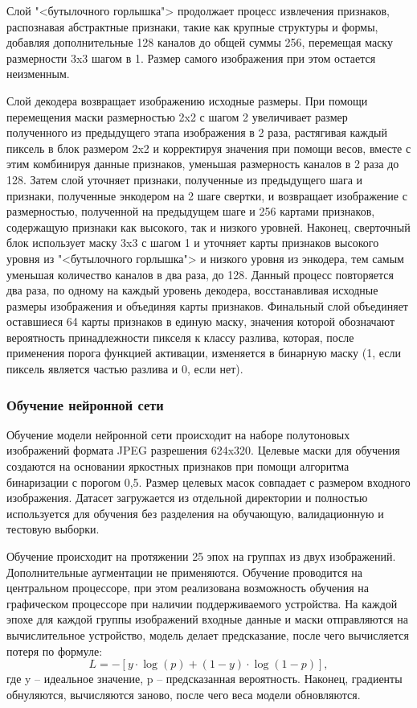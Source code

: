 Слой "<бутылочного горлышка">  продолжает процесс извлечения признаков, распознавая абстрактные признаки, такие как крупные структуры и формы, добавляя дополнительные 128 каналов до общей суммы 256, перемещая маску размерности 3x3 шагом в 1. Размер самого изображения при этом остается неизменным.

Слой декодера возвращает изображению исходные размеры. При помощи перемещения маски размерностью 2x2 с шагом 2 увеличивает размер полученного из предыдущего этапа изображения в 2 раза, растягивая каждый пиксель в блок размером 2x2 и корректируя значения при помощи весов, вместе с этим комбинируя данные признаков, уменьшая размерность каналов в 2 раза до 128. Затем слой уточняет признаки, полученные из предыдущего шага и признаки, полученные энкодером на 2 шаге свертки, и возвращает изображение с размерностью, полученной на предыдущем шаге и 256 картами признаков, содержащую признаки как высокого, так и низкого уровней. Наконец, сверточный блок использует маску 3x3 с шагом 1 и уточняет карты признаков высокого уровня из "<бутылочного горлышка"> и низкого уровня из энкодера, тем самым уменьшая количество каналов в два раза, до 128. Данный процесс повторяется два раза, по одному на каждый уровень декодера, восстанавливая исходные размеры изображения и объединяя карты признаков. Финальный слой объединяет оставшиеся 64 карты признаков в единую маску, значения  которой обозначают вероятность принадлежности пикселя к классу разлива, которая, после применения порога функцией активации, изменяется в бинарную маску (1, если пиксель является частью разлива и 0, если нет).

\subsubsection{Обучение нейронной сети}

Обучение модели нейронной сети происходит на наборе полутоновых изображений формата JPEG разрешения 624x320. Целевые маски для обучения создаются на основании яркостных признаков при помощи алгоритма бинаризации с порогом 0,5. Размер целевых масок совпадает с размером входного изображения. Датасет загружается из отдельной директории и полностью используется для обучения без разделения на обучающую, валидационную и тестовую выборки.

Обучение происходит на протяжении 25 эпох на группах из двух изображений. Дополнительные аугментации не применяются. Обучение проводится на центральном процессоре, при этом реализована возможность обучения на графическом процессоре при наличии поддерживаемого устройства. На каждой эпохе для каждой группы изображений входные данные и маски отправляются на вычислительное устройство, модель делает предсказание, после чего вычисляется потеря по формуле:
\[
L = -\left[ y \cdot \log(p) + (1 - y) \cdot \log(1 - p) \right],
\]
где y -- идеальное значение, p -- предсказанная вероятность. Наконец, градиенты обнуляются, вычисляются заново, после чего веса модели обновляются.	

